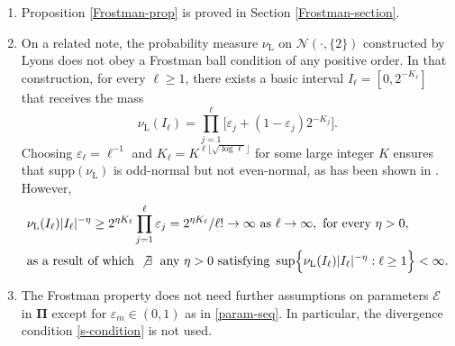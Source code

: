 \documentclass[12pt, twoside]{article}
\theoremstyle{definition}
\numberwithin{equation}{section}
\begin{document}
\begin{enumerate}[1.]
\item Proposition \ref{Frostman-prop} is proved in Section \ref{Frostman-section}.  
\item On a related note, the probability measure $\nu_{\text{L}}$ on $\mathscr{N}(\cdot, \{2\})$ constructed by Lyons \cite{l86} does not obey a Frostman ball condition of any positive order. In that construction, for every $\ell \geq 1$, there exists a basic interval $I_{\ell} = [0, 2^{-K_{\ell}}]$ that receives the mass 
\[ \nu_{\text{L}}(I_{\ell}) = \prod_{j=1}^{\ell} \bigl[\varepsilon_j + (1 - \varepsilon_j) 2^{-K_j} \bigr]. \]
Choosing $\varepsilon_{\ell} = \ell^{-1}$ and $K_{\ell} = K^{\ell \lfloor \sqrt{\log \ell} \rfloor}$ for some large integer $K$ ensures that supp$(\nu_{\text{L}})$ is odd-normal but not even-normal, as has been shown in \cite{PZ-1}. However, 
\begin{align*} 
&\nu_{\text{L}}(I_{\ell}) |I_{\ell}|^{-\eta} \geq 2^{\eta K_{\ell}}\prod_{j=1}^{\ell} \varepsilon_j = 2^{\eta K_{\ell}}/ \ell! \rightarrow \infty \text{ as } \ell \rightarrow \infty, \text{ for every $\eta > 0$}, \\ 
&\text{as a result of which } \not\exists \; \text{ any } \eta > 0 \text{ satisfying } \sup\Bigl\{ {\nu_{\text{L}}(I_{\ell})}{|I_{\ell}|^{-\eta}} : \ell \geq 1 \Bigr\} < \infty.   
 \end{align*}   
\item The Frostman property does not need further assumptions on parameters $\mathcal E$ in $\pmb{\Pi}$ except for $\varepsilon_m \in (0,1)$ as in \eqref{param-seq}. In particular, the divergence condition \eqref{s-condition} is not used. 
\end{enumerate} 
\end{document}

